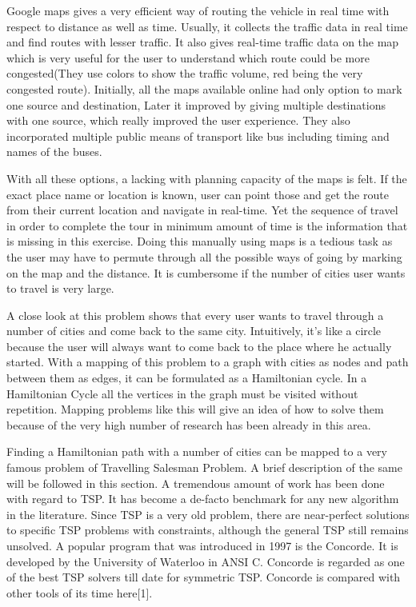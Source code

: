 \documentclass[conference]{IEEEtran}
\begin{document}
Google maps gives a very efficient way of routing the vehicle in real time with respect to distance as well as time. Usually, it collects the traffic data in real time and find routes with lesser traffic. It also gives real-time traffic data on the map which is very useful for the user to understand which route could be more congested(They use colors to show the traffic volume, red being the very congested route).
Initially, all the maps available online had only option to mark one source and destination, Later it improved by giving multiple destinations with one source, which really improved the user experience. They also incorporated multiple public means of transport like bus including timing and names of the buses.

With all these options, a lacking with planning capacity of the maps is felt. If the exact place name or location is known, user can point those and get the route from their current location and navigate in real-time. Yet the sequence of travel in order to complete the tour in minimum  amount of time is the information that is missing in this exercise. Doing this manually using maps is a tedious task as the user may have to permute through all the possible ways of going by marking on the map and the distance. It is cumbersome if the number of cities user wants to travel is very large.

A close look at this problem shows that every user wants to travel through a number of cities and come back to the same city. Intuitively, it's like a circle because the user will always want to come back to the place where he actually started. With a mapping of this problem to a graph with cities as nodes and path between them as edges, it can be formulated as a Hamiltonian cycle. In a Hamiltonian Cycle all the vertices in the graph must be visited without repetition. Mapping problems like this will give an idea of how to solve them because of the very high number of research has been already in this area.

Finding a Hamiltonian path with a number of cities can be mapped to a very famous problem of Travelling Salesman Problem. A brief description of the same will be followed in this section. A tremendous amount of work has been done with regard to TSP. It has become a de-facto benchmark for any new algorithm in the literature. Since TSP is a very old problem, there are near-perfect solutions to specific TSP problems with constraints, although the general TSP still remains unsolved. A popular program that was introduced in 1997 is the Concorde. It is developed by the University of Waterloo in ANSI C. Concorde is regarded as one of the best TSP solvers till date for symmetric TSP. Concorde is compared with other tools of its time here[1].
\end{document}
